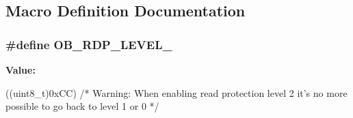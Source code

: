 \subsection{Macro Definition Documentation}
\hypertarget{group___f_l_a_s_h_ex___option___bytes___read___protection_ga2262afca565429ce2808d835c49e5ee6}{
\subsubsection[{O\-B\-\_\-\-R\-D\-P\-\_\-\-L\-E\-V\-E\-L\-\_\-2}]{\setlength{\rightskip}{0pt plus 5cm}\#define O\-B\-\_\-\-R\-D\-P\-\_\-\-L\-E\-V\-E\-L\-\_}}\label{group___f_l_a_s_h_ex___option___bytes___read___protection_ga2262afca565429ce2808d835c49e5ee6}
{\bfseries Value\-:}
\begin{DoxyCode}
((uint8\_t)0xCC) \textcolor{comment}{/* Warning: When enabling read protection level 2 }
\textcolor{comment}{                                                it's no more possible to go back to level 1 or 0 */}
\end{DoxyCode}
